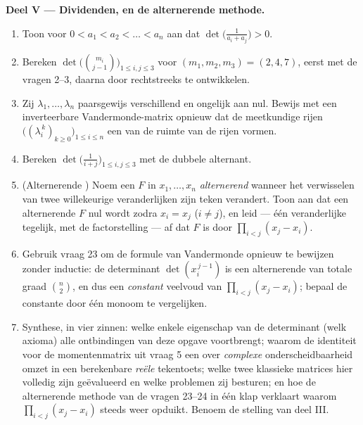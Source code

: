 \begin{problem}
\medskip
\noindent\textbf{Deel V --- Dividenden, en de alternerende
methode.}
\begin{enumerate}[resume]
  \item Toon voor $0 < a_1 < a_2 < \dots < a_n$ aan dat
        $\det\bigl(\frac{1}{a_i + a_j}\bigr) > 0$.
  \item Bereken $\det\bigl(\binom{m_i}{j-1}\bigr)_{1 \leq i, j \leq
        3}$ voor $(m_1, m_2, m_3) = (2, 4, 7)$, eerst met de vragen
        2--3, daarna door rechtstreeks te ontwikkelen.
  \item Zij $\lambda_1, \dots, \lambda_n$ paarsgewijs verschillend
        en ongelijk aan nul. Bewijs met een inverteerbare
        Vandermonde-matrix opnieuw dat de meetkundige rijen
        $\bigl((\lambda_i^{\,k})_{k \geq 0}\bigr)_{1 \leq i \leq
        n}$ een  van de ruimte van de rijen vormen.
  \item Bereken $\det\bigl(\frac{1}{i + j}\bigr)_{1 \leq i, j \leq
        3}$ met de dubbele alternant.
  \item (Alternerende ) Noem een  $F$ in $x_1,
        \dots, x_n$ \emph{alternerend} wanneer het verwisselen van
        twee willekeurige veranderlijken zijn teken verandert. Toon
        aan dat een alternerende $F$ nul wordt zodra $x_i = x_j$
        ($i \neq j$), en leid --- één veranderlijke tegelijk, met
        de factorstelling --- af dat $F$  is door
        $\prod_{i<j}(x_j - x_i)$.
  \item Gebruik vraag 23 om de formule van Vandermonde opnieuw te
        bewijzen zonder inductie: de determinant $\det(x_i^{\,j-1})$
        is een alternerende  van totale graad $\binom n2$,
        en dus een \emph{constant} veelvoud van $\prod_{i<j}(x_j -
        x_i)$; bepaal de constante door één monoom te vergelijken.
  \item Synthese, in vier zinnen: welke enkele eigenschap van de
        determinant (welk axioma) alle ontbindingen van deze opgave
        voortbrengt; waarom de identiteit voor de momentenmatrix uit
        vraag 5 een  over \emph{complexe} onderscheidbaarheid
        omzet in een berekenbare \emph{reële} tekentoets; welke twee
        klassieke matrices hier volledig zijn geëvalueerd en welke
         problemen zij besturen; en hoe de alternerende
        methode van de vragen 23--24 in één klap verklaart waarom
        $\prod_{i<j}(x_j - x_i)$ steeds weer opduikt. Benoem de
        stelling van deel III.
\end{enumerate}
\end{problem}
